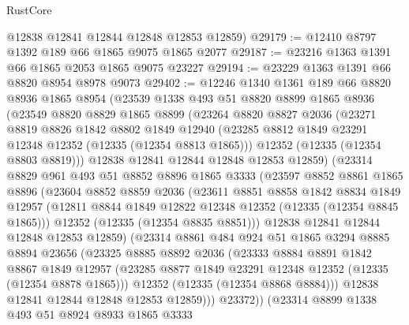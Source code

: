 \begin{lexlean}{RustCore}
\begin{coremodule}
      @12838
      @12841
      @12844
      @12848
      @12853
      @12859)
@29179 := @12410 @8797 @1392 @189 @66 @1865 @9075 @1865 @2077
@29187 := @23216 @1363 @1391 @66 @1865 @2053 @1865 @9075 @23227
@29194 := @23229 @1363 @1391 @66 @8820 @8954 @8978 @9073
@29402 := @12246
    @1340
    @1361
    @189
    @66
    @8820
    @8936
    @1865
    @8954
    (@23539
      @1338
      @493
      @51
      @8820
      @8899
      @1865
      @8936
      (@23549
        @8820
        @8829
        @1865
        @8899
        (@23264
          @8820
          @8827
          @2036
          (@23271
            @8819
            @8826
            @1842
            @8802
            @1849
            @12940
            (@23285 @8812 @1849 @23291 @12348 @12352 (@12335 (@12354 @8813 @1865)))
            @12352
            (@12335 (@12354 @8803 @8819)))
          @12838
          @12841
          @12844
          @12848
          @12853
          @12859)
        (@23314
          @8829
          @961
          @493
          @51
          @8852
          @8896
          @1865
          @3333
          (@23597
            @8852
            @8861
            @1865
            @8896
            (@23604
              @8852
              @8859
              @2036
              (@23611
                @8851
                @8858
                @1842
                @8834
                @1849
                @12957
                (@12811 @8844 @1849 @12822 @12348 @12352 (@12335 (@12354 @8845 @1865)))
                @12352
                (@12335 (@12354 @8835 @8851)))
              @12838
              @12841
              @12844
              @12848
              @12853
              @12859)
            (@23314
              @8861
              @484
              @924
              @51
              @1865
              @3294
              @8885
              @8894
              @23656
              (@23325
                @8885
                @8892
                @2036
                (@23333
                  @8884
                  @8891
                  @1842
                  @8867
                  @1849
                  @12957
                  (@23285 @8877 @1849 @23291 @12348 @12352 (@12335 (@12354 @8878 @1865)))
                  @12352
                  (@12335 (@12354 @8868 @8884)))
                @12838
                @12841
                @12844
                @12848
                @12853
                @12859)))
          @23372))
      (@23314
        @8899
        @1338
        @493
        @51
        @8924
        @8933
        @1865
        @3333

\end{coremodule}
\end{lexlean}
